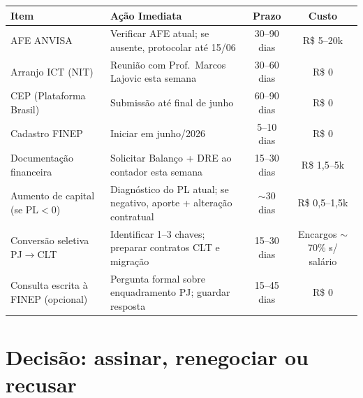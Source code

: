 \documentclass[11pt, a4paper]{article}
\begin{document}
\renewcommand{\arraystretch}{1.3}
\begin{table}[H]
    \centering
    \small
    \begin{tabularx}{\textwidth}{@{} l X c c @{}}
        \toprule
        \rowcolor{tableHeader} \textbf{Item} & \textbf{Ação Imediata} & \textbf{Prazo} & \textbf{Custo} \\
        \midrule
        AFE ANVISA & Verificar AFE atual; se ausente, protocolar até 15/06 & 30--90 dias & R\$ 5--20k \\
        \rowcolor{lightGray}
        Arranjo ICT (NIT) & Reunião com Prof.\ Marcos Lajovic esta semana & 30--60 dias & R\$ 0 \\
        CEP (Plataforma Brasil) & Submissão até final de junho & 60--90 dias & R\$ 0 \\
        \rowcolor{lightGray}
        Cadastro FINEP & Iniciar em junho/2026 & 5--10 dias & R\$ 0 \\
        Documentação financeira & Solicitar Balanço + DRE ao contador esta semana & 15--30 dias & R\$ 1,5--5k \\
        Aumento de capital (se PL$<$0) & Diagnóstico do PL atual; se negativo, aporte + alteração contratual & $\sim$30 dias & R\$ 0,5--1,5k \\
        \rowcolor{lightGray}
        Conversão seletiva PJ$\to$CLT & Identificar 1--3 chaves; preparar contratos CLT e migração & 15--30 dias & Encargos $\sim$70\% s/ salário \\
        Consulta escrita à FINEP (opcional) & Pergunta formal sobre enquadramento PJ; guardar resposta & 15--45 dias & R\$ 0 \\
        \bottomrule
    \end{tabularx}
\end{table}

\section{Decisão: assinar, renegociar ou recusar}
\end{document}
